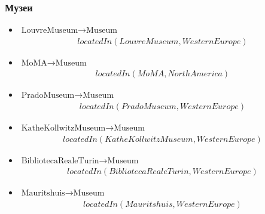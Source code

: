 \documentclass[a4paper, 11pt]{article}
\begin{document}
\subsubsection*{Музеи}
\begin{itemize}
  \item $\text{LouvreMuseum} \to \text{Museum}$
    \begin{align*}
      locatedIn(LouvreMuseum, WesternEurope)
    \end{align*}
  \item $\text{MoMA} \to \text{Museum}$
    \begin{align*}
      locatedIn(MoMA, NorthAmerica)
    \end{align*}
  \item $\text{PradoMuseum} \to \text{Museum}$
    \begin{align*}
      locatedIn(PradoMuseum, WesternEurope)
    \end{align*}
  \item $\text{KatheKollwitzMuseum} \to \text{Museum}$
    \begin{align*}
      locatedIn(KatheKollwitzMuseum, WesternEurope)
    \end{align*}
  \item $\text{BibliotecaRealeTurin} \to \text{Museum}$
    \begin{align*}
      locatedIn(BibliotecaRealeTurin, WesternEurope)
    \end{align*}
  \item $\text{Mauritshuis} \to \text{Museum}$
    \begin{align*}
      locatedIn(Mauritshuis, WesternEurope)
    \end{align*}
\end{itemize}
\end{document}
